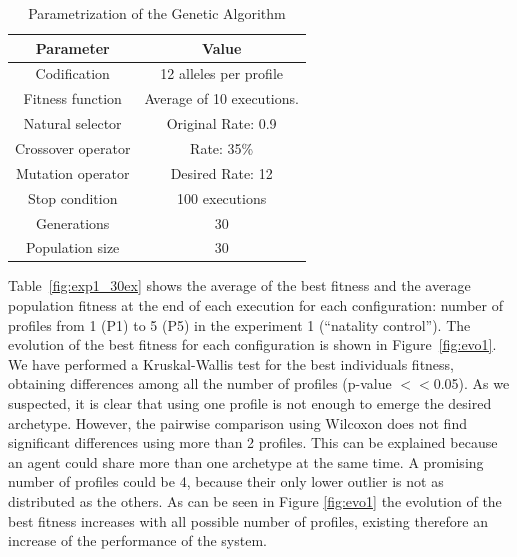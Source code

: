 \documentclass{sig-alternate}
\begin{document}
\begin{table}
\begin{center}
\caption{Parametrization of the Genetic Algorithm}
\label{fig:ga_parameters}
\begin{tabular}{cc}%
\hline\noalign{\smallskip}
\noalign{\smallskip}
Parameter & Value \\
\hline
\noalign{\smallskip}
Codification & 12 alleles per profile\\
Fitness function & Average of 10 executions.\\
Natural selector & Original Rate: 0.9 \\
Crossover operator & Rate: 35\% \\
Mutation operator & Desired Rate: 12 \\
Stop condition & 100 executions\\
Generations & 30\\
Population size & 30 \\
\hline
\end{tabular}


\end{center}
\end{table}






Table~\ref{fig:exp1_30ex} shows the average of the best fitness and the average population fitness at the end of each execution for each configuration: number of profiles from 1 (P1) to 5 (P5) in the experiment 1 (``natality control'').
The evolution of the best fitness for each configuration is shown in Figure~\ref{fig:evo1}. We have performed a Kruskal-Wallis test for the best individuals fitness, obtaining differences among all the number of profiles (p-value $<<$0.05). As we suspected, it is clear that using one profile is not enough to emerge the desired archetype. However, the pairwise comparison using Wilcoxon does not find significant differences using more than 2 profiles. This can be explained because an agent could share more than one archetype at the same time.  A promising number of profiles could be 4, because their only lower outlier is not as distributed as the others. As can be seen in Figure \ref{fig:evo1} the evolution of the best fitness increases with all possible number of profiles, existing therefore an increase of the performance of the system.
\end{document}

